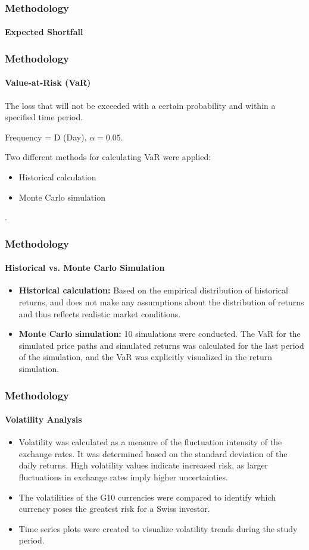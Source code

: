 \documentclass[10pt]{beamer}
\begin{document}
\begin{frame}
\frametitle{Methodology}
\framesubtitle{Expected Shortfall}

\end{frame}
\begin{frame}
\frametitle{Methodology}
\framesubtitle{Value-at-Risk (VaR)}
The loss that will not be exceeded with a certain probability and within a specified time period. 

Frequency = D (Day), $\alpha = 0.05$. 

Two different methods for calculating VaR were applied:
\begin{itemize}
    \item Historical calculation
    \item Monte Carlo simulation
\end{itemize}.

\end{frame}
\begin{frame}
\frametitle{Methodology}
\framesubtitle{Historical vs. Monte Carlo Simulation}
\begin{itemize}
    \item \textbf{Historical calculation:} Based on the empirical distribution of historical returns, and does not make any assumptions about the distribution of returns and thus reflects realistic market conditions.
    \item \textbf{Monte Carlo simulation:} 10 simulations were conducted. The VaR for the simulated price paths and simulated returns was calculated for the last period of the simulation, and the VaR was explicitly visualized in the return simulation. 
\end{itemize}
\end{frame}
\begin{frame}
\frametitle{Methodology}
\framesubtitle{Volatility Analysis}
\begin{itemize}
    \item Volatility was calculated as a measure of the fluctuation intensity of the exchange rates. It was determined based on the standard deviation of the daily returns. High volatility values indicate increased risk, as larger fluctuations in exchange rates imply higher uncertainties.
    \item The volatilities of the G10 currencies were compared to identify which currency poses the greatest risk for a Swiss investor.
    \item Time series plots were created to visualize volatility trends during the study period.
\end{itemize}
\end{frame}
\end{document}
